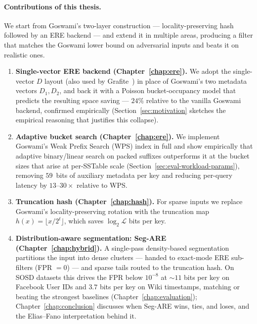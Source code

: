 \paragraph{Contributions of this thesis.}
We start from Goswami's two-layer construction --- locality-preserving
hash followed by an ERE backend --- and extend it in multiple areas,
producing a filter that matches the Goswami
lower bound on adversarial inputs and beats it on realistic ones.
\begin{enumerate}
    \item \textbf{Single-vector ERE backend (Chapter~\ref{chap:ere}).}
    We adopt the single-vector $D$ layout (also used by
    Grafite~\citep{grafite2024}) in place of Goswami's two metadata
    vectors $D_1, D_2$, and back it with a Poisson bucket-occupancy
    model that predicts the resulting space saving --- $24\%$ relative
    to the vanilla Goswami backend, confirmed empirically
    (Section~\ref{sec:motivation} sketches the empirical reasoning
    that justifies this collapse).

    \item \textbf{Adaptive bucket search (Chapter~\ref{chap:ere}).}
    We implement Goswami's Weak Prefix Search (WPS) index in full and
    show empirically that adaptive binary/linear search on packed
    suffixes outperforms it at the bucket sizes that arise at per-SSTable
    scale (Section~\ref{sec:eval-workload-params}), removing $59$~bits of
    auxiliary metadata per key and reducing per-query latency by
    $13$--$30\times$ relative to WPS.

    \item \textbf{Truncation hash (Chapter~\ref{chap:hash}).}
    For sparse inputs we replace Goswami's locality-preserving
    rotation with the truncation map $h(x) = \lfloor x/2^t \rfloor$,
    which saves $\log_2 \mathcal{L}$ bits per key.

    \item \textbf{Distribution-aware segmentation: Seg-ARE (Chapter~\ref{chap:hybrid}).}
    A single-pass density-based segmentation partitions the input
    into dense clusters --- handed to exact-mode ERE sub-filters
    (FPR $= 0$) --- and sparse tails routed to the truncation hash.
    On SOSD datasets this drives the FPR below $10^{-8}$ at
    $\sim\!11$ bits per key on Facebook User IDs and $3.7$ bits per key on
    Wiki timestamps, matching or beating the strongest baselines
    (Chapter~\ref{chap:evaluation}); Chapter~\ref{chap:conclusion}
    discusses when Seg-ARE wins, ties, and loses, and the
    Elias--Fano interpretation behind it.


\end{enumerate}
